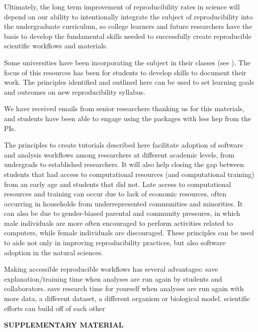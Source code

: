 \documentclass[12pt]{article}
\begin{document}
Ultimately, the long term improvement of reproducibility rates in science will depend
on our ability to intentionally integrate the subject of reproducibility into the
undergraduate curriculum, so college learners and future researchers have the
basis to develop the fundamental skills needed to successfully create reproducible
scientific workflows and materials.

Some universities have been incorporating the subject in their classes (see
\cite{uwlibraries2022, nigms2022}).
The focus of this resources has been for students to develop skills to document their work.
The principles identified and outlined here can be used to set learning goals and
outcomes on new reproducibility syllabus.





We have received emails from senior researchers thanking us for this materials,
 and students have been able to engage using the packages with less hep from the PIs.

The principles to create tutorials described here facilitate adoption of software
 and analysis workflows among researchers at different academic levels, from undergrads
  to established researchers.
It will also help closing the gap between students that had access to computational
 resources (and computational training) from an early age and students that did not.
  Late access to computational resources and training can occur due to lack of
   economic resources, often occurring in households from underrepresented communities
    and minorities.
It can also be due to gender-biased parental and community pressures,
 in which male individuals are more often encouraged to perform activities related to computers,
  while female individuals are discouraged.
These principles can be used to aide not only in improving reproducibility practices,
 but also software adoption in the natural sciences.


Making accessible reproducible workflows has several advantages:
save explanation/training time when analyses are run again by students and collaborators.
save research time for yourself when analyses are run again with more data, a different dataset, a different organism or biological model.
scientific efforts can build off of each other

\bigskip
\begin{center}
{\large\bf SUPPLEMENTARY MATERIAL}
\end{center}
\end{document}
